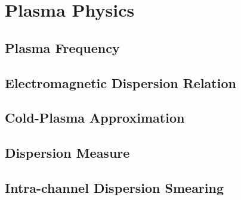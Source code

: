 \chapter{Plasma Physics}

\section{Plasma Frequency}


\section{Electromagnetic Dispersion Relation}
\TODO

\section{Cold-Plasma Approximation}
\TODO

\section{Dispersion Measure}


\section{Intra-channel Dispersion Smearing}


